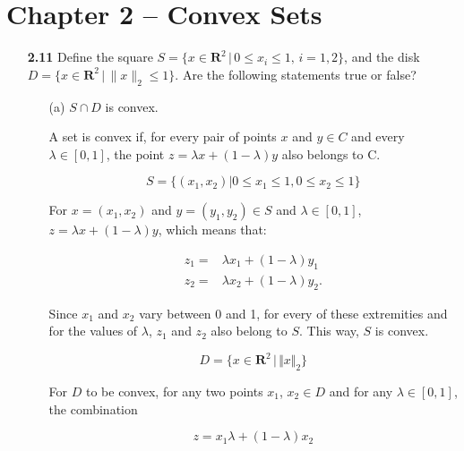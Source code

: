\documentclass[11pt,a4paper]{article}
\begin{document}
\section*{Chapter 2 -- Convex Sets}

\begin{itemize}
    \item[\textbf{2.11}] Define the square $S = \{x \in \mathbf{R}^2 \,\vert\, 0 \leq x_i \leq 1, \, i = 1, 2\}$, and the disk $D = \{x \in \mathbf{R}^2 \, \vert \, \|x\|_2 \leq 1\}$. Are the following statements true or false?
    \item[] \begin{itemize}
        \item[(a)] $S \cap D$ is convex.
            
        A set is convex if, for every pair of points $x$ and $y \in C$ and every $\lambda \in [0, 1]$, the point $z = \lambda x + (1-\lambda)y$ also belongs to C. 

        \begin{equation*}
            S = \{(x_1, x_2) \vert 0 \leq x_1 \leq 1, 0 \leq x_2 \leq 1\}
        \end{equation*}
        
        For $x = (x_1, x_2)$ and $y = (y_1, y_2) \in S$ and $\lambda \in [0, 1]$, $z = \lambda x + (1- \lambda)y$, which means that:
        
        \begin{equation*}
            \begin{aligned}
                z_1 = & \lambda x_1 + (1- \lambda)y_1\\ 
                z_2 = & \lambda x_2 + (1- \lambda)y_2.
            \end{aligned}
        \end{equation*}

        Since $x_1$ and $x_2$ vary between 0 and 1, for every of these extremities and for the values of $\lambda$, $z_1$ and $z_2$ also belong to $S$. This way, $S$ is convex.

        \begin{equation*}
            D = \{x \in \mathbf{R}^2 \,\vert\, \Vert x \Vert_2\}
        \end{equation*}

        For $D$ to be convex, for any two points $x_1$, $x_2 \in D$ and for any $\lambda \in [0,1]$, the combination

        \begin{equation*}
            z = x_1 \lambda + (1-\lambda)x_2
        \end{equation*}


\end{itemize}
\end{itemize}
\end{document}
